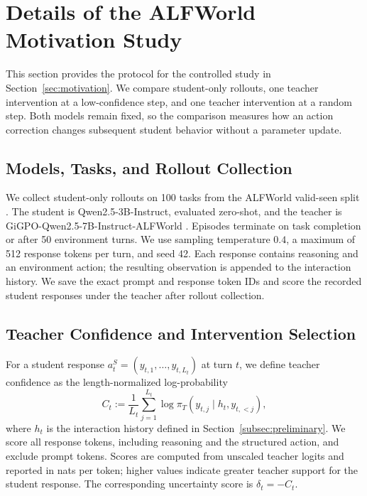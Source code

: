 \section{Details of the ALFWorld Motivation Study}
\label{app:motivation_details}

This section provides the protocol for the controlled study in
Section~\ref{sec:motivation}. We compare student-only rollouts, one teacher
intervention at a low-confidence step, and one teacher intervention at a random
step. Both models remain fixed, so the comparison measures how an action
correction changes subsequent student behavior without a parameter update.

\subsection{Models, Tasks, and Rollout Collection}

We collect student-only rollouts on 100 tasks from the ALFWorld valid-seen split
\citep{shridhar2021alfworld}. The student is Qwen2.5-3B-Instruct, evaluated
zero-shot, and the teacher is GiGPO-Qwen2.5-7B-Instruct-ALFWorld
\citep{feng2025gigpo}. Episodes terminate on task completion or after 50
environment turns. We use sampling temperature $0.4$, a maximum of 512 response
tokens per turn, and seed 42. Each response contains reasoning and an environment
action; the resulting observation is appended to the interaction history.
We save the exact prompt and response token IDs and score the recorded student
responses under the teacher after rollout collection.

\subsection{Teacher Confidence and Intervention Selection}

For a student response $a_t^S=(y_{t,1},\ldots,y_{t,L_t})$ at turn $t$, we define
teacher confidence as the length-normalized log-probability
\begin{equation}
C_t := \frac{1}{L_t}\sum_{j=1}^{L_t}
\log\pi_T(y_{t,j}\mid h_t,y_{t,<j}),
\label{eq:app_teacher_confidence}
\end{equation}
where $h_t$ is the interaction history defined in Section~\ref{subsec:preliminary}. We score all response
tokens, including reasoning and the structured action, and exclude prompt
tokens. Scores are computed from unscaled teacher logits and reported in nats
per token; higher values indicate greater teacher support for the student
response. The corresponding uncertainty score is $\delta_t=-C_t$.

